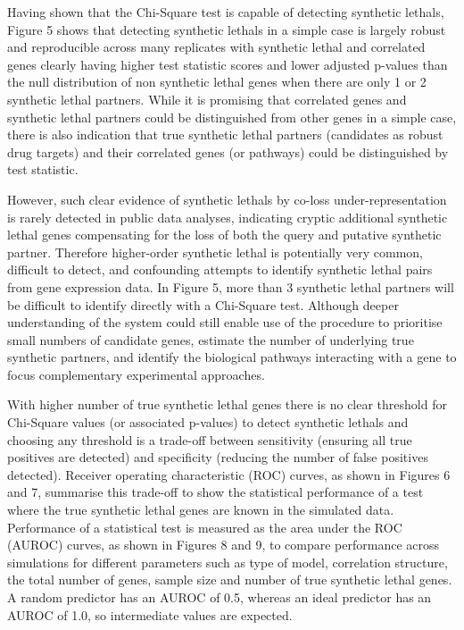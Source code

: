 Having shown that the Chi-Square test is capable of detecting \glspl{synthetic lethal}, Figure 5 shows that detecting \glspl{synthetic lethal} in a simple case is largely robust and reproducible across many replicates with \gls{synthetic lethal} and correlated genes clearly having higher test statistic scores and lower adjusted p-values than the null distribution of non synthetic lethal genes when there are only 1 or 2 \gls{synthetic lethal} partners.  While it is promising that correlated genes and \gls{synthetic lethal} partners could be distinguished from other genes in a simple case, there is also indication that true \gls{synthetic lethal} partners (candidates as robust drug targets) and their correlated genes (or pathways) could be distinguished by test statistic.

However, such clear evidence of \glspl{synthetic lethal} by co-loss under-representation is rarely detected in public data analyses, indicating cryptic additional \gls{synthetic lethal} genes compensating for the loss of both the query and putative synthetic partner.  Therefore higher-order \gls{synthetic lethal} is potentially very common, difficult to detect, and confounding attempts to identify \gls{synthetic lethal} pairs from \gls{gene expression} data.  In Figure 5, more than 3 \gls{synthetic lethal} partners will be difficult to identify directly with a Chi-Square test.  Although deeper understanding of the system could still enable use of the procedure to prioritise small numbers of candidate genes, estimate the number of underlying true synthetic partners, and identify the biological pathways interacting with a gene to focus complementary experimental approaches.

With higher number of true \gls{synthetic lethal} genes there is no clear threshold for Chi-Square values (or associated p-values) to detect \glspl{synthetic lethal} and choosing any threshold is a trade-off between sensitivity (ensuring all true positives are detected) and specificity (reducing the number of false positives detected).  Receiver operating characteristic (ROC) curves, as shown in Figures 6 and 7, summarise this trade-off to show the statistical performance of a test where the true \gls{synthetic lethal} genes are known in the simulated data.  Performance of a statistical test is measured as the area under the \gls{ROC} (AUROC) curves, as shown in Figures 8 and 9, to compare performance across simulations for different parameters such as type of model, correlation structure, the total number of genes, sample size and number of true \gls{synthetic lethal} genes.  A random predictor has an \gls{AUROC} of 0.5, whereas an ideal predictor has an \gls{AUROC} of 1.0, so intermediate values are expected.

